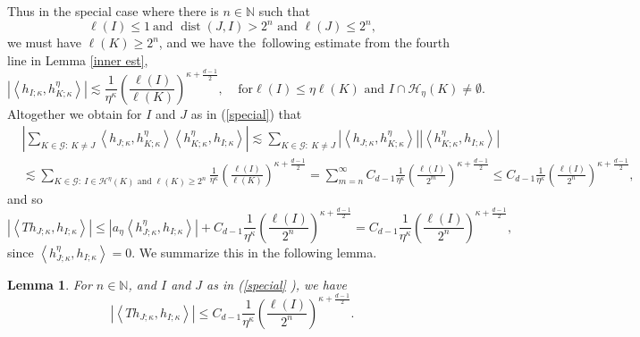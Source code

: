 \documentclass{amsart}%
\theoremstyle{plain}
\newtheorem{lemma}[theorem]{Lemma}
\numberwithin{equation}{section}
\begin{document}
Thus in the special case where there is $n\in\mathbb{N}$ such that
\begin{equation}
\ell\left(  I\right)  \leq1\ \text{and }\operatorname*{dist}\left(
J,I\right)  >2^{n}\text{ and }\ell\left(  J\right)  \leq2^{n},\label{special}%
\end{equation}
we must have $\ell\left(  K\right)  \geq2^{n}$, and we have the\ following
estimate from the fourth line in Lemma \ref{inner est},
\[
\left\vert \left\langle h_{I;\kappa},h_{K;\kappa}^{\eta}\right\rangle
\right\vert \lesssim\frac{1}{\eta^{\kappa}}\left(  \frac{\ell\left(  I\right)
}{\ell\left(  K\right)  }\right)  ^{\kappa+\frac{d-1}{2}},\ \ \ \ \ \text{for
}\ell\left(  I\right)  \leq\eta\ell\left(  K\right)  \text{ and }%
I\cap\mathcal{H}_{\eta}\left(  K\right)  \neq\emptyset.
\]
Altogether we obtain for $I$ and $J$ as in (\ref{special}) that%
\begin{align*}
& \left\vert \sum_{K\in\mathcal{G}:\ K\neq J}\left\langle h_{J;\kappa
},h_{K;\kappa}^{\eta}\right\rangle \left\langle h_{K;\kappa}^{\eta
},h_{I;\kappa}\right\rangle \right\vert \lesssim\sum_{K\in\mathcal{G}:\ K\neq
J}\left\vert \left\langle h_{J;\kappa},h_{K;\kappa}^{\eta}\right\rangle
\right\vert \left\vert \left\langle h_{K;\kappa}^{\eta},h_{I;\kappa
}\right\rangle \right\vert \\
& \lesssim\sum_{K\in\mathcal{G}:\ I\in\mathcal{H}^{\eta}\left(  K\right)
\text{ and }\ell\left(  K\right)  \geq2^{n}}\frac{1}{\eta^{\kappa}}\left(
\frac{\ell\left(  I\right)  }{\ell\left(  K\right)  }\right)  ^{\kappa
+\frac{d-1}{2}}=\sum_{m=n}^{\infty}C_{d-1}\frac{1}{\eta^{\kappa}}\left(
\frac{\ell\left(  I\right)  }{2^{m}}\right)  ^{\kappa+\frac{d-1}{2}}\leq
C_{d-1}\frac{1}{\eta^{\kappa}}\left(  \frac{\ell\left(  I\right)  }{2^{n}%
}\right)  ^{\kappa+\frac{d-1}{2}},
\end{align*}
and so%
\[
\left\vert \left\langle Th_{J;\kappa},h_{I;\kappa}\right\rangle \right\vert
\leq\left\vert a_{\eta}\left\langle h_{J;\kappa}^{\eta},h_{I;\kappa
}\right\rangle \right\vert +C_{d-1}\frac{1}{\eta^{\kappa}}\left(  \frac
{\ell\left(  I\right)  }{2^{n}}\right)  ^{\kappa+\frac{d-1}{2}}=C_{d-1}%
\frac{1}{\eta^{\kappa}}\left(  \frac{\ell\left(  I\right)  }{2^{n}}\right)
^{\kappa+\frac{d-1}{2}},
\]
since $\left\langle h_{J;\kappa}^{\eta},h_{I;\kappa}\right\rangle =0$. We
summarize this in the following lemma.

\begin{lemma}
\label{lem special}For $n\in\mathbb{N}$, and $I$ and $J$ as in (\ref{special}%
), we have%
\[
\left\vert \left\langle Th_{J;\kappa},h_{I;\kappa}\right\rangle \right\vert
\leq C_{d-1}\frac{1}{\eta^{\kappa}}\left(  \frac{\ell\left(  I\right)  }%
{2^{n}}\right)  ^{\kappa+\frac{d-1}{2}}.
\]

\end{lemma}
\end{document}
